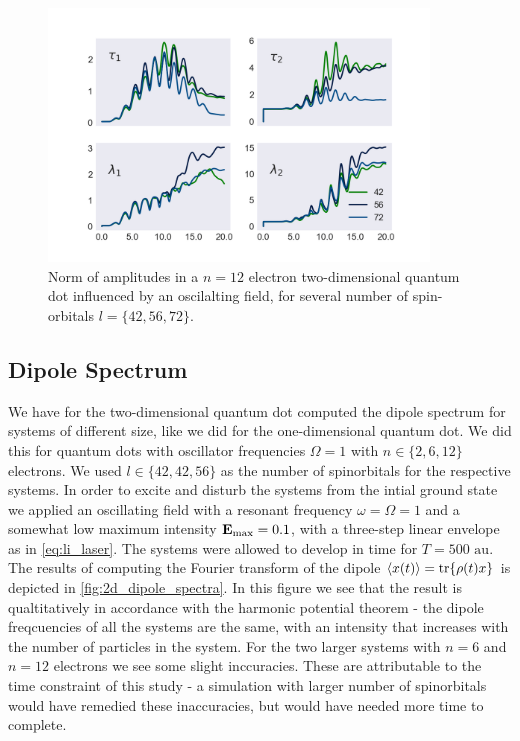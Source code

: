 \begin{figure}
    \centering
    \includegraphics[width=0.9\textwidth]{results/figures/2D/n=12_amplitudes.png}
    \caption{Norm of amplitudes in a $n=12$ electron two-dimensional quantum 
        dot influenced by an oscilalting field, for several number of 
        spin-orbitals $l=\{42,56,72\}$.
    }
    \label{fig:n12_2d_amp_norms}
\end{figure}

\subsection{Dipole Spectrum}

We have for the two-dimensional quantum dot computed the dipole spectrum for systems of 
different size, like we did for the one-dimensional quantum dot. We did this for 
quantum dots with oscillator frequencies $\Omega=1$ with $n\in\{2,6,12\}$ electrons.
We used $l\in\{42,42,56\}$ as the number of spinorbitals for the respective systems.
In order to excite and disturb the systems from the intial ground state we applied 
an oscillating field with a resonant frequency $\omega=\Omega=1$ and a somewhat low 
maximum intensity $\vb{E}_\text{max}=0.1$, with a three-step linear envelope as 
in \autoref{eq:li_laser}. The systems were allowed to develop in time for 
$T = 500 \text{ au}$. The results of computing the Fourier transform of the 
dipole $\ev{x(t)} = \tr{\rho(t) x}$ is depicted in \autoref{fig:2d_dipole_spectra}. 
In this figure we see that the result is qualtitatively in accordance with the 
harmonic potential theorem - the dipole freqcuencies of all the systems are the 
same, with an intensity that increases with the number of particles in the system.
For the two larger systems with $n=6$ and $n=12$ electrons we see some slight 
inccuracies. These are attributable to the time constraint of this study - 
a simulation with larger number of spinorbitals would have remedied these 
inaccuracies, but would have needed more time to complete.

